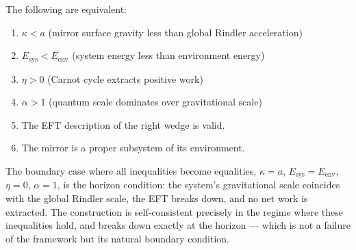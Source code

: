 \documentclass[12pt,a4paper]{article}
\begin{document}
The following are equivalent:
%
\begin{enumerate}
    \item $\kappa < a$ \quad (mirror surface gravity less 
    than global Rindler acceleration)
    \item $E_{\text{sys}} < E_{\text{env}}$ \quad 
    (system energy less than environment energy)
    \item $\eta > 0$ \quad (Carnot cycle extracts 
    positive work)
    \item $\alpha > 1$ \quad (quantum scale dominates 
    over gravitational scale)
    \item The EFT description of the right wedge is valid.
    \item The mirror is a proper subsystem of its 
    environment.
\end{enumerate}
%
The boundary case where all inequalities become equalities,
$\kappa = a$, $E_{\text{sys}} = E_{\text{env}}$, $\eta = 0$, 
$\alpha = 1$, is the horizon condition: the system's 
gravitational scale coincides with the global Rindler 
scale, the EFT breaks down, and no net work is extracted. 
The construction is self-consistent precisely in the regime 
where these inequalities hold, and breaks down exactly at 
the horizon --- which is not a failure of the framework 
but its natural boundary condition.



\end{document}
